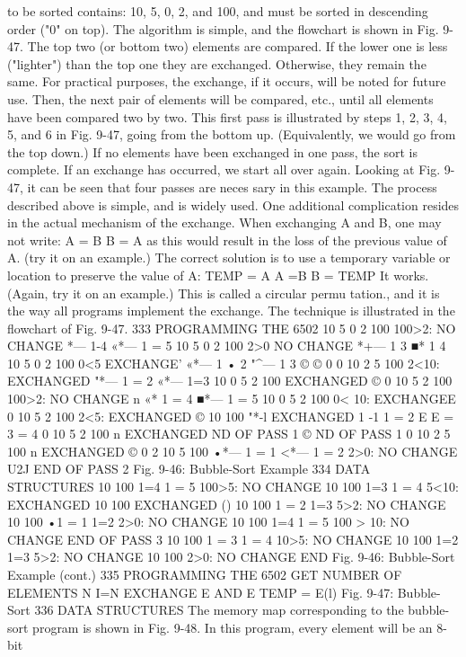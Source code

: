 \documentclass{book}
\begin{document}
{{{{{{{{{{{{{{{{{{{{{{{{{{{{{{{{{{{{{{{{{{{{{{{{{{{{{{{{{{{{{{{{{{{{{{{{{{{{{{{{{{{{{{{{{{{{{{to be sorted contains: 10, 5, 0, 2, and 100, and must be sorted in
descending order ("0" on top). The algorithm is simple, and the
flowchart is shown in Fig. 9-47.
The top two (or bottom two) elements are compared. If the
lower one is less ("lighter") than the top one they are exchanged.
Otherwise, they remain the same. For practical purposes, the exchange,
if it occurs, will be noted for future use. Then, the next pair of elements
will be compared, etc., until all elements have been compared two by two.
This first pass is illustrated by steps 1, 2, 3, 4, 5, and 6 in Fig. 9-47,
going from the bottom up. (Equivalently, we would go from the top
down.)
If no elements have been exchanged in one pass, the sort is complete.
If an exchange has occurred, we start all over again.
Looking at Fig. 9-47, it can be seen that four passes are neces
sary in this example.
The process described above is simple, and is widely used.
One additional complication resides in the actual mechanism of
the exchange. When exchanging A and B, one may not write:
A = B
B = A
as this would result in the loss of the previous value of A. (try it on
an example.)
The correct solution is to use a temporary variable or location to
preserve the value of A:
TEMP = A
A =B
B = TEMP
It works. (Again, try it on an example.) This is called a circular permu
tation., and it is the way all programs implement the exchange. The
technique is illustrated in the flowchart of Fig. 9-47.
333
PROGRAMMING THE 6502
10
5
0
2
100
100>2:
NO CHANGE
*— 1-4
«*— 1 = 5
10
5
0
2
100
2>0
NO CHANGE
*+— 1 3
■* 1 4
10
5
0
2
100
0<5
EXCHANGE'
«*— 1 • 2
"^— 1 3
© ©
0
0
10
2
5
100
2<10:
EXCHANGED
"*— 1 = 2
«*— 1=3
10
0
5
2
100
EXCHANGED
©
0
10
5
2
100
100>2:
NO CHANGE
n
«* 1 = 4
■*— 1 = 5
10
0
5
2
100
0< 10:
EXCHANGEE
0
10
5
2
100
2<5:
EXCHANGED
©
10
100
"*-l
EXCHANGED
1 -1
1 = 2
E
E
= 3
= 4
0
10
5
2
100
n
EXCHANGED
ND OF PASS 1
©
ND OF PASS 1
0
10
2
5
100
n
EXCHANGED
©
0
2
10
5
100
•*— 1 = 1
<*— 1 = 2
2>0:
NO CHANGE
U2J
END OF PASS 2
Fig. 9-46: Bubble-Sort Example
334
DATA STRUCTURES
10
100
1=4
1 = 5
100>5:
NO CHANGE
10
100
1=3
1 = 4
5<10:
EXCHANGED
10
100
EXCHANGED
(\5)
10
100
1 = 2
1=3
5>2:
NO CHANGE
10
100
•1 = 1
1=2
2>0:
NO CHANGE
10
100
1=4
1 = 5
100 > 10:
NO CHANGE
END OF PASS 3
10
100
1 = 3
1 = 4
10>5:
NO CHANGE
10
100
1=2
1=3
5>2:
NO CHANGE
10
100
2>0:
NO CHANGE
END
Fig. 9-46: Bubble-Sort Example (cont.)
335
PROGRAMMING THE 6502
GET NUMBER OF
ELEMENTS N
I=N
EXCHANGE E AND E
TEMP = E(l)
Fig. 9-47: Bubble-Sort
336
DATA STRUCTURES
The memory map corresponding to the bubble-sort program is
shown in Fig. 9-48. In this program, every element will be an 8-bit
}}}}}}}}}}}}}}}}}}}}}}}}}}}}}}}}}}}}}}}}}}}}}}}}}}}}}}}}}}}}}}}}}}}}}}}}}}}}}}}}}}}}}}}}}}}}}}
\end{document}
